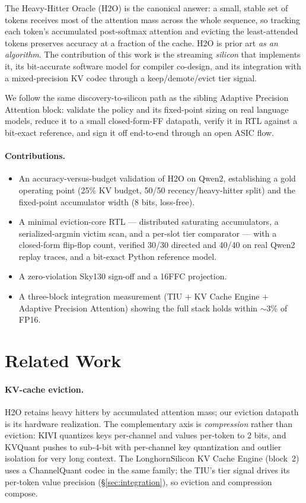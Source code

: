 \documentclass[10pt,twocolumn]{article}
\begin{document}
The Heavy-Hitter Oracle (H2O) \citep{zhang2023h2o} is the canonical answer: a
small, stable set of tokens receives most of the attention mass across the whole
sequence, so tracking each token's accumulated post-softmax attention and evicting
the least-attended tokens preserves accuracy at a fraction of the cache. H2O is
prior art \emph{as an algorithm}. The contribution of this work is the streaming
\emph{silicon} that implements it, its bit-accurate software model for compiler
co-design, and its integration with a mixed-precision KV codec through a
keep/demote/evict tier signal.

We follow the same discovery-to-silicon path as the sibling Adaptive Precision
Attention block: validate the policy and its fixed-point sizing on real language
models, reduce it to a small closed-form-FF datapath, verify it in RTL against a
bit-exact reference, and sign it off end-to-end through an open ASIC flow.

\paragraph{Contributions.}
\begin{itemize}
  \item An accuracy-versus-budget validation of H2O on Qwen2, establishing a gold
    operating point (25\% KV budget, 50/50 recency/heavy-hitter split) and the
    fixed-point accumulator width (8 bits, loss-free).
  \item A minimal eviction-core RTL --- distributed saturating accumulators, a
    serialized-argmin victim scan, and a per-slot tier comparator --- with a
    closed-form flip-flop count, verified 30/30 directed and 40/40 on real Qwen2
    replay traces, and a bit-exact Python reference model.
  \item A zero-violation Sky130 sign-off and a 16FFC projection.
  \item A three-block integration measurement (TIU $+$ KV Cache Engine $+$
    Adaptive Precision Attention) showing the full stack holds within $\sim$3\% of
    FP16.
\end{itemize}

\section{Related Work}

\paragraph{KV-cache eviction.}
H2O \citep{zhang2023h2o} retains heavy hitters by accumulated attention mass; our
eviction datapath is its hardware realization. The complementary axis is
\emph{compression} rather than eviction: KIVI \citep{liu2024kivi} quantizes keys
per-channel and values per-token to 2 bits, and KVQuant \citep{hooper2024kvquant}
pushes to sub-4-bit with per-channel key quantization and outlier isolation for
very long context. The LonghornSilicon KV Cache Engine (block~2) uses a
ChannelQuant codec in the same family; the TIU's tier signal drives its per-token
value precision (\S\ref{sec:integration}), so eviction and compression compose.
\end{document}
